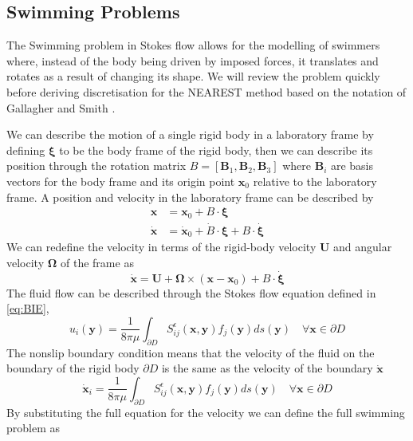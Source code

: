 \FloatBarrier
\subsection{Swimming Problems} \label{sec:swimming}
The Swimming problem in Stokes flow allows for the modelling of swimmers where, instead of the body being driven by imposed forces, it translates and rotates as a result of changing its shape. We will review the problem quickly before deriving discretisation for the NEAREST method based on the notation of Gallagher and Smith \cite{Gallagher2018MeshfreeCells}.

We can describe the motion of a single rigid body in a laboratory frame by defining $\bm{\xi}$ to be the body frame of the rigid body, then we can describe its position through the rotation matrix $B = [\bm{B}_1,\bm{B}_2,\bm{B}_3]$ where $\bm{B}_i$ are basis vectors for the body frame and its origin point $\bm{x}_0$ relative to the laboratory frame. A position and velocity in the laboratory frame can be described by
\begin{equation*}
\begin{aligned}
    \bm{x} &= \bm{x}_0 + B\cdot\bm{\xi} \\
    \dot{\bm{x}} &= \dot{\bm{x}}_0 + \dot{B}\cdot\bm{\xi} + B\cdot\dot{\bm{\xi}}
\end{aligned}
\end{equation*}
We can redefine the velocity in terms of the rigid-body velocity $\bm{U}$ and angular velocity $\bm{\Omega}$ of the frame as
\begin{equation*}
    \dot{\bm{x}} = \bm{U} + \bm{\Omega}\times (\bm{x}-\bm{x}_0) + B\cdot\dot{\bm{\xi}}
\end{equation*}
The fluid flow can be described through the Stokes flow equation defined in \cref{eq:BIE},
\begin{equation*}
    u_i(\bm{y}) = \frac{1}{8 \pi \mu} \int_{\partial D} S_{i j}^{\epsilon}\left(\bm{x}, \bm{y}\right) f_{j}(\bm{y}) d s(\bm{y}) \quad \forall \bm{x}\in\partial D
\end{equation*}
The nonslip boundary condition means that the velocity of the fluid on the boundary of the rigid body $\partial D$ is the same as the velocity of the boundary $\dot{\bm{x}}$
\begin{equation*}
    \dot{\bm{x}}_i = \frac{1}{8 \pi \mu} \int_{\partial D} S_{i j}^{\epsilon}\left(\bm{x}, \bm{y}\right) f_{j}(\bm{y}) d s(\bm{y}) \quad \forall \bm{x}\in\partial D
\end{equation*}
By substituting the full equation for the velocity we can define the full swimming problem as
